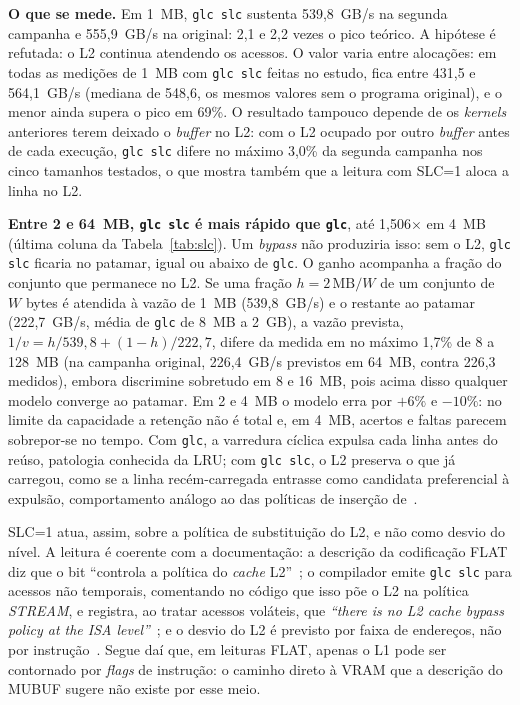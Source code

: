 \documentclass[12pt]{article}
\begin{document}
\textbf{O que se mede.} Em 1~MB, \texttt{glc slc} sustenta 539,8~GB/s na
segunda campanha e 555,9~GB/s na original: 2,1 e 2,2 vezes o pico teórico.
A hipótese é refutada: o L2 continua atendendo os acessos. O valor varia
entre alocações: em todas as medições de 1~MB com \texttt{glc slc} feitas no
estudo, fica entre 431,5 e 564,1~GB/s (mediana de 548,6, os mesmos valores sem o programa original), e
o menor ainda supera o pico em 69\%. O resultado tampouco depende de os
\textit{kernels} anteriores terem deixado o \textit{buffer} no L2: com o L2
ocupado por outro \textit{buffer} antes de cada execução, \texttt{glc slc} difere
no máximo 3,0\% da segunda campanha nos cinco tamanhos testados, o que mostra também
que a leitura com SLC=1 aloca a linha no L2.

\textbf{Entre 2 e 64~MB, \texttt{glc slc} é mais rápido que \texttt{glc}}, até
1,506$\times$ em 4~MB (última coluna da Tabela~\ref{tab:slc}). Um \textit{bypass}
não produziria isso: sem o L2, \texttt{glc slc} ficaria no patamar, igual ou
abaixo de \texttt{glc}. O ganho acompanha a fração do conjunto que permanece no
L2. Se uma fração $h = 2\,\textrm{MB}/W$ de um conjunto de $W$ bytes é atendida à
vazão de 1~MB (539,8~GB/s) e o restante ao patamar (222,7~GB/s, média de
\texttt{glc} de 8~MB a 2~GB), a vazão prevista, $1/v = h/539{,}8 +
(1-h)/222{,}7$, difere da medida em no máximo 1,7\% de 8 a 128~MB (na campanha original,
226,4~GB/s previstos em 64~MB, contra 226,3 medidos), embora discrimine sobretudo
em 8 e 16~MB, pois acima disso qualquer modelo converge ao patamar. Em 2 e 4~MB o
modelo erra por $+6\%$ e $-10\%$: no limite da capacidade a retenção não é total
e, em 4~MB, acertos e faltas parecem sobrepor-se no tempo. Com \texttt{glc}, a varredura cíclica expulsa cada linha antes do
reúso, patologia conhecida da LRU; com \texttt{glc slc}, o L2 preserva o que já
carregou, como se a linha recém-carregada entrasse como candidata preferencial à
expulsão, comportamento análogo ao das políticas de inserção
de~\cite{qureshi2007}.

SLC=1 atua, assim, sobre a política de substituição do L2, e não como
desvio do nível. A leitura é coerente com a documentação: a descrição da
codificação FLAT diz que o bit ``controla a política do \textit{cache}
L2''~\cite[Seção~13.9]{amdgcn3}; o compilador emite \texttt{glc slc} para acessos
não temporais, comentando no código que isso põe o L2 na política
\textit{STREAM}, e registra, ao tratar acessos voláteis, que \textit{``there is no
L2 cache bypass policy at the ISA level''}~\cite{llvmlegalizer}; e o desvio do L2 é previsto por faixa de
endereços, não por instrução~\cite{llvmamdgpu}. Segue daí que, em leituras FLAT, apenas o L1
pode ser contornado por \textit{flags} de instrução: o caminho direto à VRAM que
a descrição do MUBUF sugere não existe por esse meio.
\end{document}

